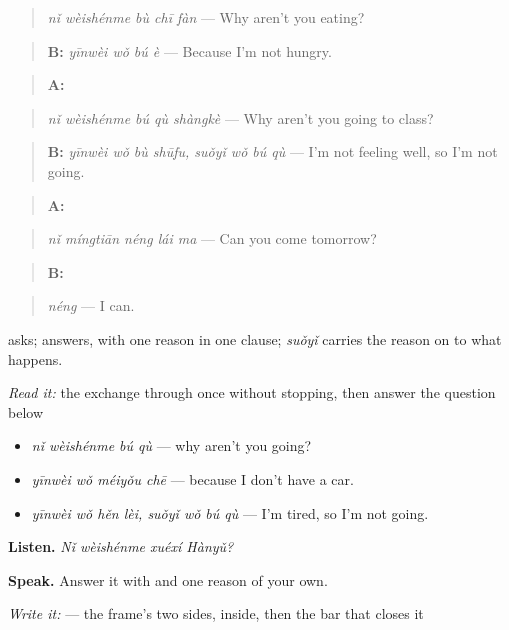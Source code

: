 \begin{quote}
\emph{nǐ wèishénme bù chī fàn} — Why aren't you eating?
\end{quote}

\begin{quote}
\textbf{B:} \emph{yīnwèi wǒ bú è} — Because I'm not hungry.
\end{quote}

\begin{quote}
\textbf{A:} 
\end{quote}

\begin{quote}
\emph{nǐ wèishénme bú qù shàngkè} — Why aren't you going to class?
\end{quote}

\begin{quote}
\textbf{B:} \emph{yīnwèi wǒ bù shūfu, suǒyǐ wǒ bú qù} — I'm not feeling well, so I'm not going.
\end{quote}

\begin{quote}
\textbf{A:} 
\end{quote}

\begin{quote}
\emph{nǐ míngtiān néng lái ma} — Can you come tomorrow?
\end{quote}

\begin{quote}
\textbf{B:} 
\end{quote}

\begin{quote}
\emph{néng} — I can.
\end{quote}

 asks;  answers, with one reason in one clause; \emph{suǒyǐ} carries the reason on to what happens.

\begin{tcolorbox}[breakable,skin=enhanced,colback=orange!6,colframe=orange!45!black,boxrule=0.5pt,arc=1mm,left=6pt,right=6pt,top=4pt,bottom=4pt,fonttitle=\bfseries,title={Read this}]
\emph{Read it:} the exchange through once without stopping, then answer the question below
\end{tcolorbox}

\begin{grammarlens}[title={What you've built — a question and its reason}]
\begin{itemize}
\raggedright
  \item \textbf{} \emph{nǐ wèishénme bú qù} — why aren't you going?
  \item \textbf{} \emph{yīnwèi wǒ méiyǒu chē} — because I don't have a car.
  \item \emph{yīnwèi wǒ hěn lèi, suǒyǐ wǒ bú qù} — I'm tired, so I'm not going.
\end{itemize}

\textbf{Listen.} \emph{Nǐ wèishénme xuéxí Hànyǔ?}

\textbf{Speak.} Answer it with  and one reason of your own.

\emph{Write it:}  — the frame's two sides,  inside, then the bar that closes it
\end{grammarlens}

